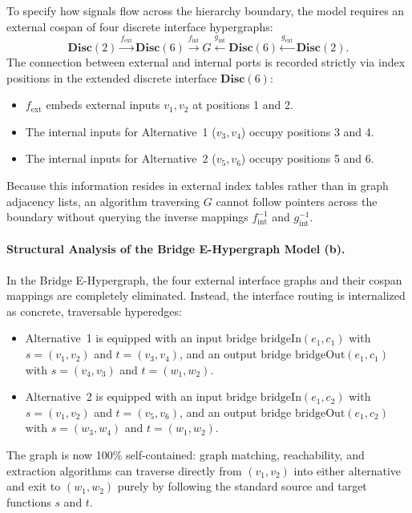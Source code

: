 \documentclass[11pt,a4paper]{article}
\theoremstyle{definition}
\theoremstyle{plain}
\begin{document}
To specify how signals flow across the hierarchy boundary, the model requires an external cospan of four discrete interface hypergraphs:
\[
\mathbf{Disc}(2) \xrightarrow{f_{\text{ext}}} \mathbf{Disc}(6) \xrightarrow{f_{\text{int}}} G \xleftarrow{g_{\text{int}}} \mathbf{Disc}(6) \xleftarrow{g_{\text{ext}}} \mathbf{Disc}(2).
\]
The connection between external and internal ports is recorded strictly via index positions in the extended discrete interface $\mathbf{Disc}(6)$:
\begin{itemize}
    \item $f_{\text{ext}}$ embeds external inputs $v_1, v_2$ at positions 1 and 2.
    \item The internal inputs for Alternative~1 ($v_3, v_4$) occupy positions 3 and 4.
    \item The internal inputs for Alternative~2 ($v_5, v_6$) occupy positions 5 and 6.
\end{itemize}
Because this information resides in external index tables rather than in graph adjacency lists, an algorithm traversing $G$ cannot follow pointers across the boundary without querying the inverse mappings $f_{\text{int}}^{-1}$ and $g_{\text{int}}^{-1}$.

\paragraph{Structural Analysis of the Bridge E-Hypergraph Model (b).}
In the Bridge E-Hypergraph, the four external interface graphs and their cospan mappings are completely eliminated. Instead, the interface routing is internalized as concrete, traversable hyperedges:
\begin{itemize}
    \item Alternative~1 is equipped with an input bridge $\mathrm{bridgeIn}(e_1, c_1)$ with $s = (v_1, v_2)$ and $t = (v_3, v_4)$, and an output bridge $\mathrm{bridgeOut}(e_1, c_1)$ with $s = (v_4, v_3)$ and $t = (w_1, w_2)$.
    \item Alternative~2 is equipped with an input bridge $\mathrm{bridgeIn}(e_1, c_2)$ with $s = (v_1, v_2)$ and $t = (v_5, v_6)$, and an output bridge $\mathrm{bridgeOut}(e_1, c_2)$ with $s = (w_3, w_4)$ and $t = (w_1, w_2)$.
\end{itemize}
The graph is now 100\% self-contained: graph matching, reachability, and extraction algorithms can traverse directly from $(v_1, v_2)$ into either alternative and exit to $(w_1, w_2)$ purely by following the standard source and target functions $s$ and $t$.
\end{document}
